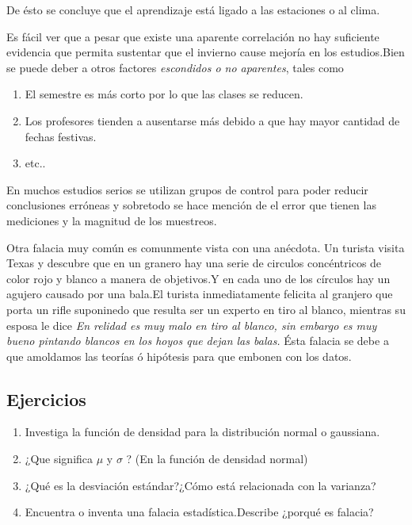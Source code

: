 \documentclass{article}
\begin{document}
De ésto se concluye que el aprendizaje está ligado a las estaciones o al clima.

Es fácil ver que a pesar que existe una aparente correlación no hay suficiente evidencia que permita sustentar que el invierno cause mejoría en los estudios.Bien se puede deber a otros factores \textit{escondidos o no aparentes}, tales como
\begin{enumerate}
\item El semestre es más corto por lo que las clases se reducen.
\item Los profesores tienden a ausentarse más debido a que hay mayor cantidad de fechas festivas.
\item etc..
\end{enumerate}
En muchos estudios serios se utilizan grupos de control para poder reducir conclusiones erróneas y sobretodo se hace mención de el error que tienen las mediciones y la magnitud de los muestreos.

Otra falacia muy común es comunmente vista con una anécdota.
Un turista visita Texas y descubre que en un granero hay una serie de circulos concéntricos de color rojo y blanco a manera de objetivos.Y en cada uno de los círculos hay un agujero causado por una bala.El turista inmediatamente felicita al granjero que porta un rifle suponinedo que resulta ser un experto en tiro al blanco, mientras su esposa le dice \textit{En relidad es muy malo en tiro al blanco, sin embargo es muy bueno pintando blancos en los hoyos que dejan las balas.}
Ésta falacia se debe a que amoldamos las teorías ó hipótesis para que embonen con los datos.




\subsection{Ejercicios}
\begin{enumerate}
\item Investiga la función de densidad para la distribución normal o gaussiana.
\item ¿Que significa $\mu$ y $\sigma$ ? (En la función de densidad normal)
\item ¿Qué es la desviación estándar?¿Cómo está relacionada con la varianza?
\item Encuentra o inventa una falacia estadística.Describe ¿porqué es falacia?
\end{enumerate}
\end{document}
